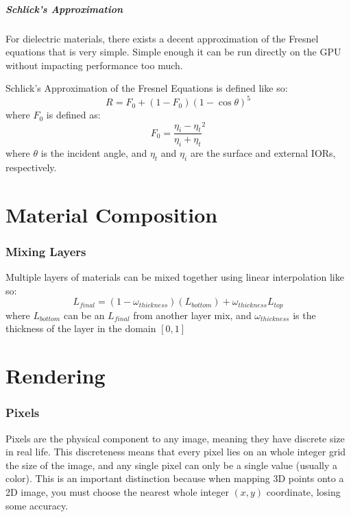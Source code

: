 \documentclass[12pt,letterpaper]{article}
\begin{document}
\subsubsection{Schlick's Approximation}
\label{sec:schlick}

For dielectric materials, there exists a decent approximation of the Fresnel equations that is very simple. 
Simple enough it can be run directly on the GPU without impacting performance too much.

Schlick's Approximation of the Fresnel Equations is defined like so:
$$
R = F_0 + \left(1 - F_0\right){\left(1 - \cos \theta\right)}^5
$$
where $F_0$ is defined as:
$$
F_0 = {\frac{\eta_i - \eta_t}{\eta_i + \eta_t}}^2
$$
where $\theta$ is the incident angle, and $\eta_t$ and $\eta_i$ are the surface and external IORs, respectively.

\newpage

\part{Material Composition}

\section{Mixing Layers}
\label{sec:mixing_layers}

Multiple layers of materials can be mixed together using linear interpolation like so:
$$
L_{final} = \left(1 - \omega_{thickness}\right)\left(L_{bottom}\right) + \omega_{thickness} L_{top}
$$
where $L_{bottom}$ can be an $L_{final}$ from another layer mix, 
and $\omega_{thickness}$ is the thickness of the layer in the domain $\left[0,1\right]$

\newpage
\part{Rendering}

\section{Pixels}

Pixels are the physical component to any image, meaning they have discrete size in real life. 
This discreteness means that every pixel lies on an whole integer grid the size of the image, 
and any single pixel can only be a single value (usually a color). This is an important distinction because when mapping 3D points
onto a 2D image, you must choose the nearest whole integer $(x,y)$ coordinate, losing some accuracy.
\end{document}
